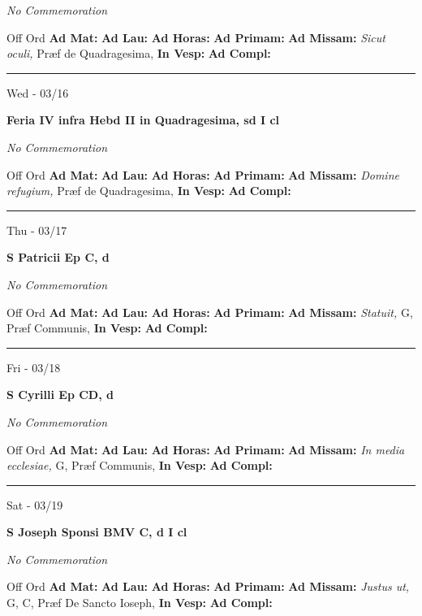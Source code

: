 \documentclass[letterpaper, 10pt]{article}
\begin{document}
\textit{No Commemoration}\begin{justify}
Off Ord
\textbf{Ad Mat: }
\textbf{Ad Lau: }
\textbf{Ad Horas: }
\textbf{Ad Primam: }
\textbf{Ad Missam:} \textit{Sicut oculi, } Præf de Quadragesima, 
\textbf{In Vesp: }
\textbf{Ad Compl: }\end{justify}



\hrule
\begin{center}
Wed - 03/16
\end{center}\textbf{ \large Feria IV infra Hebd II in Quadragesima, \textnormal{\normalsize sd I cl}}

\textit{No Commemoration}\begin{justify}
Off Ord
\textbf{Ad Mat: }
\textbf{Ad Lau: }
\textbf{Ad Horas: }
\textbf{Ad Primam: }
\textbf{Ad Missam:} \textit{Domine refugium, } Præf de Quadragesima, 
\textbf{In Vesp: }
\textbf{Ad Compl: }\end{justify}



\hrule
\begin{center}
Thu - 03/17
\end{center}\textbf{ \large S Patricii Ep C, \textnormal{\normalsize d}}

\textit{No Commemoration}\begin{justify}
Off Ord
\textbf{Ad Mat: }
\textbf{Ad Lau: }
\textbf{Ad Horas: }
\textbf{Ad Primam: }
\textbf{Ad Missam:} \textit{Statuit, } G, Præf Communis, 
\textbf{In Vesp: }
\textbf{Ad Compl: }\end{justify}



\hrule
\begin{center}
Fri - 03/18
\end{center}\textbf{ \large S Cyrilli Ep CD, \textnormal{\normalsize d}}

\textit{No Commemoration}\begin{justify}
Off Ord
\textbf{Ad Mat: }
\textbf{Ad Lau: }
\textbf{Ad Horas: }
\textbf{Ad Primam: }
\textbf{Ad Missam:} \textit{In media ecclesiae, } G, Præf Communis, 
\textbf{In Vesp: }
\textbf{Ad Compl: }\end{justify}



\hrule
\begin{center}
Sat - 03/19
\end{center}\textbf{ \large S Joseph Sponsi BMV C, \textnormal{\normalsize d I cl}}

\textit{No Commemoration}\begin{justify}
Off Ord
\textbf{Ad Mat: }
\textbf{Ad Lau: }
\textbf{Ad Horas: }
\textbf{Ad Primam: }
\textbf{Ad Missam:} \textit{Justus ut, } G, C, Præf De Sancto Ioseph, 
\textbf{In Vesp: }
\textbf{Ad Compl: }\end{justify}
\end{document}
